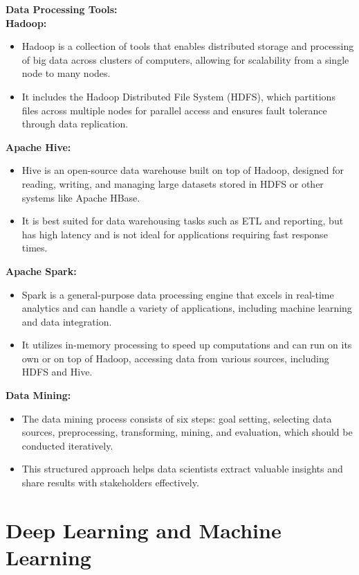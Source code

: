 \documentclass[12pt]{report} %
\begin{document}
	\noindent \textbf{Data Processing Tools:}\\
	
	\textbf{Hadoop:}
	\begin{itemize}
		\item Hadoop is a collection of tools that enables distributed storage and processing of big data across clusters of computers, allowing for scalability from a single node to many nodes.
		\item It includes the Hadoop Distributed File System (HDFS), which partitions files across multiple nodes for parallel access and ensures fault tolerance through data replication.
	\end{itemize}

	\textbf{Apache Hive:}
	\begin{itemize}
		\item Hive is an open-source data warehouse built on top of Hadoop, designed for reading, writing, and managing large datasets stored in HDFS or other systems like Apache HBase.
		\item It is best suited for data warehousing tasks such as ETL and reporting, but has high latency and is not ideal for applications requiring fast response times.
	\end{itemize}

	\textbf{Apache Spark:}
	\begin{itemize}
		\item Spark is a general-purpose data processing engine that excels in real-time analytics and can handle a variety of applications, including machine learning and data integration.
		\item It utilizes in-memory processing to speed up computations and can run on its own or on top of Hadoop, accessing data from various sources, including HDFS and Hive.
	\end{itemize}


	\noindent \textbf{Data Mining:}
		\begin{itemize}
		\item The data mining process consists of six steps: goal setting, selecting data sources, preprocessing, transforming, mining, and evaluation, which should be conducted iteratively.
		\item This structured approach helps data scientists extract valuable insights and share results with stakeholders effectively.
	\end{itemize}
	
	
	\section{Deep Learning and Machine Learning}
	
\end{document}
